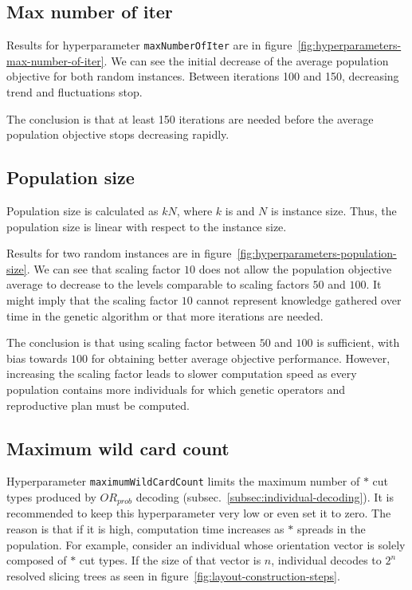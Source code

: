 \subsection{Max number of iter}\label{subsec:max-number-of-iter}
Results for hyperparameter \verb|maxNumberOfIter| are in figure~\ref{fig:hyperparameters-max-number-of-iter}.
We can see the initial decrease of the average population objective for both random instances.
Between iterations 100 and 150, decreasing trend and fluctuations stop.

The conclusion is that at least 150 iterations are needed before the average population objective
stops decreasing rapidly.

\subsection{Population size}\label{subsec:population-size}

Population size is calculated as $kN$, where $k$ is 
and $N$ is instance size.
Thus, the population size is linear with respect to the instance size.

Results for two random instances are in figure~\ref{fig:hyperparameters-population-size}.
We can see that scaling factor $10$ does not allow
the population objective average to decrease to the levels comparable to scaling factors $50$ and $100$.
It might imply that the scaling factor $10$ cannot represent knowledge gathered over time
in the genetic algorithm or that more iterations are needed.

The conclusion is that using scaling factor between $50$ and $100$ is sufficient, with bias towards $100$
for obtaining better average objective performance.
However, increasing the scaling factor leads to slower computation speed as every population contains
more individuals for which genetic operators and reproductive plan must be computed.

\subsection{Maximum wild card count}\label{subsec:maximum-wild-card-count}
Hyperparameter \verb|maximumWildCardCount| limits the maximum number of $*$ cut types produced by $OR_{prob}$ decoding (subsec.~\ref{subsec:individual-decoding}).
It is recommended to keep this hyperparameter very low or even set it to zero.
The reason is that if it is high, computation time increases as $*$ spreads in the population.
For example, consider an individual whose orientation vector is solely composed of $*$ cut types.
If the size of that vector is $n$, individual decodes to $2^n$ resolved slicing trees as seen in figure~\ref{fig:layout-construction-steps}.


